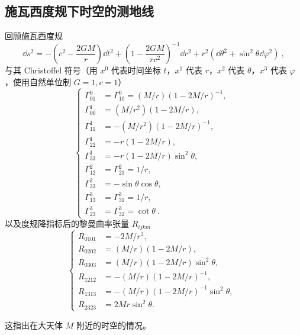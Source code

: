 
\subsection{施瓦西度规下时空的测地线}
回顾施瓦西度规
\begin{equation}
\dd  s^2 = -\left(c^2 - \frac{2GM}{r}\right) \dd t^2+ \left(1-\frac{2GM}{r c^2}\right)^{-1}\dd r^2 + r^2(\dd \theta^2 + \sin^2 \theta \dd \varphi^2) ~,
\end{equation}
与其 Christoffel 符号（用 $x^0$ 代表时间坐标 $t$，$x^1$ 代表 $r$，$x^2$ 代表 $\theta$，$x^3$ 代表 $\varphi$，使用自然单位制 $G=1, c=1$）
\begin{equation}
\left\{
\begin{aligned}
\Gamma^0_{01} &= \Gamma^0_{10} = (M/r)(1-2M/r)^{-1},\\
\Gamma^1_{00} &= (M/r^2)(1-2M/r),\\ 
\Gamma^1_{11} &= -(M/r^2)(1-2M/r)^{-1},\\
\Gamma^1_{22} &= -r(1-2M/r),\\
\Gamma^1_{33} &= -r(1-2M/r)\sin^2 \theta,\\
\Gamma^2_{12} &= \Gamma^2_{21} = 1/r, \\
\Gamma^2_{33} &= -\sin \theta \cos \theta, \\
\Gamma^3_{13} &= \Gamma^3_{31} = 1/r, \\
\Gamma^3_{23} &= \Gamma^3_{32} = \cot \theta ~.
\end{aligned}\right. ~~
\end{equation}
以及度规降指标后的黎曼曲率张量 $R_{ijkm}$
\begin{equation}
\left\{
\begin{aligned}
R_{0101} &= -2M/r^3,\\
R_{0202} &= (M/r)(1-2M/r),\\
R_{0303} &= (M/r)(1-2M/r)\sin^2 \theta,\\
R_{1212} &= -(M/r)(1-2M/r)^{-1},\\
R_{1313} &= -(M/r)(1-2M/r)^{-1} \sin^2 \theta,\\
R_{2323} &= 2M r \sin^2 \theta .
\end{aligned}\right. ~~
\end{equation}

这指出在大天体 $M$ 附近的时空的情况。

